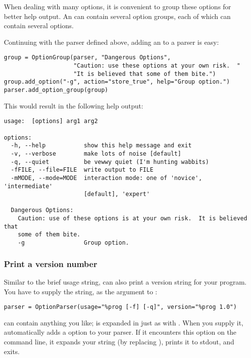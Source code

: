 When dealing with many options, it is convenient to group these
options for better help output.  An  can contain
several option groups, each of which can contain several options.

Continuing with the parser defined above, adding an
 to a parser is easy:

\begin{verbatim}
group = OptionGroup(parser, "Dangerous Options",
                    "Caution: use these options at your own risk.  "
                    "It is believed that some of them bite.")
group.add_option("-g", action="store_true", help="Group option.")
parser.add_option_group(group)
\end{verbatim}

This would result in the following help output:

\begin{verbatim}
usage:  [options] arg1 arg2

options:
  -h, --help           show this help message and exit
  -v, --verbose        make lots of noise [default]
  -q, --quiet          be vewwy quiet (I'm hunting wabbits)
  -fFILE, --file=FILE  write output to FILE
  -mMODE, --mode=MODE  interaction mode: one of 'novice', 'intermediate'
                       [default], 'expert'

  Dangerous Options:
    Caution: use of these options is at your own risk.  It is believed that
    some of them bite.
    -g                 Group option.
\end{verbatim}


\subsubsection{Print a version number\label{optparse-print-version}}

Similar to the brief usage string,  can also print a
version string for your program.  You have to supply the string, as
the  argument to :

\begin{verbatim}
parser = OptionParser(usage="%prog [-f] [-q]", version="%prog 1.0")
\end{verbatim}

 can contain anything you like;  is expanded
in  just as with .  When you supply it,
 automatically adds a  option
to your parser. If it encounters this option on the command line, it
expands your  string (by replacing ), prints
it to stdout, and exits.

